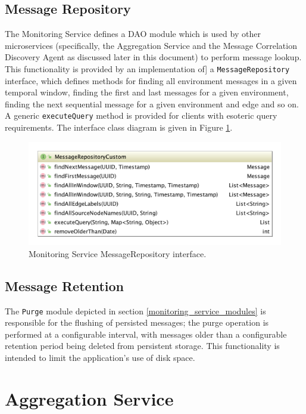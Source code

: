 \subsection{Message Repository} \label{monitoring_service_message_repository}
The Monitoring Service defines a DAO module which is used by other microservices (specifically, the Aggregation Service and the Message Correlation Discovery Agent as discussed later in this document) to perform message lookup. This functionality is provided by an implementation of]  a \texttt{MessageRepository} interface, which defines methods for finding all environment messages in a given temporal window, finding the first and last messages for a given environment, finding the next sequential message for a given environment and edge and so on. A generic \texttt{executeQuery} method is provided for clients with esoteric query requirements. The interface class diagram is given in Figure \ref{monitoring_sync_message_repository}.

\begin{figure}[H]
	\centering  
	\includegraphics[width=\linewidth]{figures/impl/monitor/message_repository.png}
	\caption{Monitoring Service MessageRepository interface.}
	\label{monitoring_sync_message_repository}
\end{figure}

\subsection{Message Retention} \label{monitoring_service_message_retention}
The \texttt{Purge} module depicted in section \ref{monitoring_service_modules} is responsible for the flushing of persisted messages; the purge operation is performed at a configurable interval, with messages older than a configurable retention period being deleted from persistent storage. This functionality is intended to limit the application's use of disk space. 
\newpage

\section{Aggregation Service}

